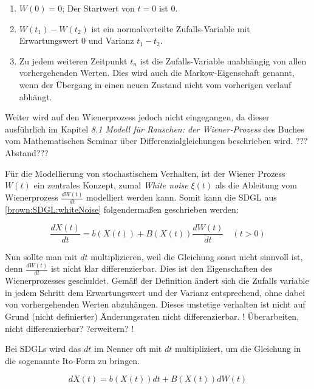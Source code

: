 \begin{enumerate}
	\item $ W(0) = 0 $; Der Startwert von $ t = 0 $ ist 0.
	\item $ W(t_{1}) - W(t_{2}) $ ist ein normalverteilte Zufalls-Variable mit Erwartungswert 0 und Varianz $ t_{1} - t_{2} $.
	\item Zu jedem weiteren Zeitpunkt $ t_{n} $ ist die Zufalls-Variable unabhängig von allen vorhergehenden Werten. Dies wird auch die Markow-Eigenschaft genannt, wenn der Übergang in einen neuen Zustand nicht vom vorherigen verlauf abhängt.
\end{enumerate}

Weiter wird auf den Wienerprozess jedoch nicht eingegangen, da dieser ausführlich im Kapitel \glqq \textit{8.1 Modell für Rauschen: der Wiener-Prozess}\glqq{} des Buches vom Mathematischen Seminar über Differenzialgleichungen beschrieben wird. ???Abstand???

  

Für die Modellierung von stochastischem Verhalten, ist der Wiener Prozess $ W(t) $ ein zentrales Konzept, zumal \textit{White noise} $ \xi(t) $ als die Ableitung vom Wienerprozess $ \frac{dW(t)}{dt} $ modelliert werden kann. Somit kann die SDGL aus \ref{brown:SDGL:whiteNoise} folgendermaßen geschrieben werden:

\begin{equation}
	\frac{dX(t)}{dt} = b(X(t)) + B(X(t)) \frac{dW(t)}{dt} \quad (t>0)
\end{equation}

Nun sollte man mit $ dt $  multiplizieren, weil die Gleichung sonst nicht sinnvoll ist, denn $ \frac{dW(t)}{dt} $ ist nicht klar differenzierbar. Dies ist den Eigenschaften des Wienerprozesses geschuldet. Gemäß der Definition ändert sich die Zufalls variable in jedem Schritt dem Erwartungswert und der Varianz entsprechend, ohne dabei von vorhergehenden Werten abzuhängen. Dieses unstetige verhalten ist nicht auf Grund (nicht definierter) Änderungsraten nicht differenzierbar.
! Überarbeiten, nicht differenzierbar? ?erweitern? ! 

Bei SDGLs wird das $ dt $ im Nenner oft mit $ dt $ multipliziert, um die Gleichung in die sogenannte \glqq{}Ito-Form\glqq{} zu bringen.

\begin{equation}
	dX(t) = b(X(t)) dt + B(X(t)) dW(t)
\end{equation}


